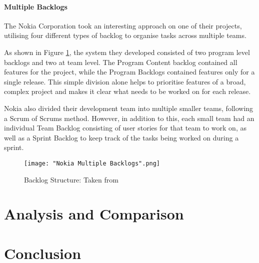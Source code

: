 \documentclass{scrartcl}
\begin{document}
\paragraph{Multiple Backlogs}\mbox{}\newline

The Nokia Corporation took an interesting approach on one of their projects, utilising four different types of backlog to organise tasks across multiple teams. \cite{laanti2008implementing}

As shown in Figure \ref{fig:backlogs}, the system they developed consisted of two program level backlogs and two at team level. The Program Content backlog contained all features for the project, while the Program Backlogs contained features only for a single release. This simple division alone helps to prioritise features of a broad, complex project and makes it clear what needs to be worked on for each release. 

Nokia also divided their development team into multiple smaller teams, following a Scrum of Scrums method. However, in addition to this, each small team had an individual Team Backlog consisting of user stories for that team to work on, as well as a Sprint Backlog to keep track of the tasks being worked on during a sprint. 
	
\begin{figure}
	\texttt{[image: "Nokia Multiple Backlogs".png]}
	\caption{Backlog Structure: Taken from \cite[p. ~1384]{laanti2008implementing}}
	\label{fig:backlogs}
\end{figure}


\section{Analysis and Comparison}



\section{Conclusion}




\end{document}
